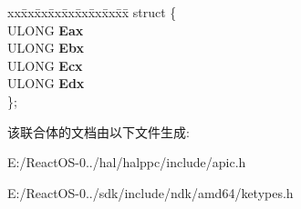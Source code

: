 \begin{DoxyCompactItemize}
\begin{tabbing}
\end{tabbing}\item 
\mbox{\label{struct___c_p_u___i_n_f_o_ad0957f3439ff1113d697d91211398972}} 
\begin{tabbing}
xx\=xx\=xx\=xx\=xx\=xx\=xx\=xx\=xx\=\kill
struct \{\\
\>ULONG {\bfseries Eax}\\
\>ULONG {\bfseries Ebx}\\
\>ULONG {\bfseries Ecx}\\
\>ULONG {\bfseries Edx}\\
\}; \\

\end{tabbing}\end{DoxyCompactItemize}


该联合体的文档由以下文件生成\+:\begin{DoxyCompactItemize}
\item 
E\+:/\+React\+O\+S-\/0../hal/halppc/include/apic.\+h\item 
E\+:/\+React\+O\+S-\/0../sdk/include/ndk/amd64/ketypes.\+h\end{DoxyCompactItemize}
